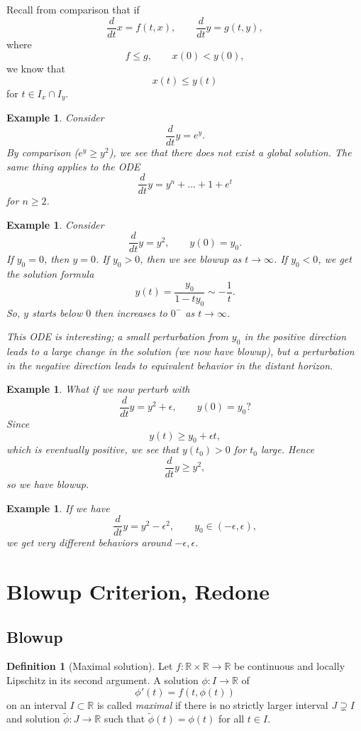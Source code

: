 \documentclass{tufte-handout}
\newcommand*\R{\mathbb{R}}
\newtheorem{ex}[thm]{Example}
\theoremstyle{definition}
\newtheorem{defn}[thm]{Definition}
\begin{document}
Recall from comparison that if \[
	\frac{d}{dt}x = f(t,x), \qquad \frac{d}{dt}y = g(t,y)
,\] where \[
	f \le g, \qquad x(0) < y(0)
,\] we know that \[
	x(t) \le y(t)
\] for $t \in I_x \cap I_y$.

\begin{ex}
	Consider \[
		\frac{d}{dt} y = e^{y}
	.\] By comparison ($e^{y} \ge y^2$), we see that there does not exist a global solution. The same thing applies to the ODE \[
		\frac{d}{dt}y = y^{n} + \ldots+1 + e^t
	\] for $n \ge 2$.
\end{ex}

\begin{ex}
	Consider \[
		\frac{d}{dt}y = y^2, \qquad y(0) = y_0
	.\] If $y_0 = 0$, then $y = 0$. If $y_0 > 0$, then we see blowup as $t \to \infty$. If $y_0 < 0$, we get the solution formula \[
		y(t) = \frac{y_0}{1-t y_0} \sim -\frac{1}{t}
	.\] So, $y$ starts below $0$ then increases to $0^-$ as $t \to \infty$.

	This ODE is interesting; a small perturbation from $y_0$ in the positive direction leads to a large change in the solution (we now have blowup), but a perturbation in the negative direction leads to equivalent behavior in the distant horizon.
\end{ex}

\begin{ex}
	What if we now perturb with \[
		\frac{d}{dt} y = y^2 + \epsilon, \qquad y(0) = y_0
	?\] 
	Since \[
		y(t) \ge y_0 + \epsilon t
	,\] which is eventually positive, we see that $y(t_0) > 0$ for $t_0$ large. Hence \[
		\frac{d}{dt} y \ge y^2
	,\] so we have blowup.
\end{ex}

\begin{ex}
	If we have \[
		\frac{d}{dt}y = y^2 - \epsilon^2, \qquad y_0 \in (-\epsilon, \epsilon)
	,\] we get very different behaviors around $-\epsilon, \epsilon$.
\end{ex}

\section{Blowup Criterion, Redone}

\subsection{Blowup}

\begin{defn}[Maximal solution]
	Let $f \colon \R \times \R \to \R$ be continuous and locally Lipschitz in its second argument.
	A solution $\phi \colon I \to \R$ of
	\[
		\phi'(t) = f(t,\phi(t))
	\]
	on an interval $I \subset \R$ is called \emph{maximal} if there is no strictly larger interval
	$J \supsetneq I$ and solution $\tilde\phi \colon J \to \R$ such that
	$\tilde\phi(t) = \phi(t)$ for all $t \in I$.
\end{defn}
\end{document}
